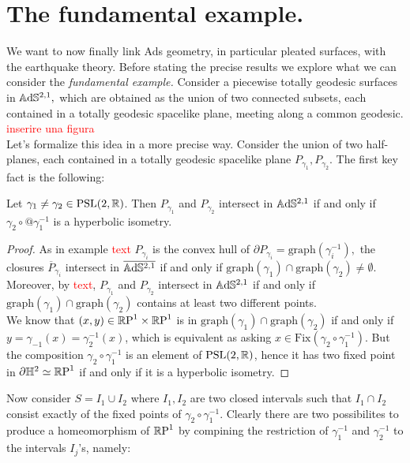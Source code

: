 \section{The fundamental example.} We want to now finally link Ads geometry, in particular pleated surfaces, with the earthquake theory. Before stating the precise results we explore what we can consider the \textit{fundamental example.} Consider a piecewise totally geodesic surfaces in $\A^{2,1},$ which are obtained as the union of two connected subsets, each contained in a totally geodesic spacelike plane, meeting along a common geodesic. \textcolor{red}{inserire una figura}\\
Let's formalize this idea in a more precise way. Consider the union of two half-planes, each contained in a totally geodesic spacelike plane $P_{\gamma_1},P_{\gamma_2}$. The first key fact is the following:

\begin{lemma}\label{Mati}
    Let $\gamma_1\neq\gamma_2\in\PSL$. Then $P_{\gamma_1}$ and $P_{\gamma_2}$ intersect in $\A^{2,1}$ if and only if $\gamma_2\circ@{\gamma_1^{-1}}$ is a hyperbolic isometry. 
\end{lemma}
\begin{proof}
    As in example \textcolor{red}{text} $P_{\gamma_i}$ is the convex hull of $\partial P_{\gamma_i}=\text{graph}(\gamma_i^{-1}),$ the closures $\overline{P}_{\gamma_i}$  intersect in $\overline{\A^{2,1}}$ if and only if $\text{graph}(\gamma_1)\cap\text{graph}(\gamma_2)\neq\emptyset$. Moreover, by \textcolor{red}{text}, $P_{\gamma_1}$ and $P_{\gamma_2}$ intersect in $\A^{2,1}$ if and only if $\text{graph}(\gamma_1)\cap\text{graph}(\gamma_2)$ contains at least two different points. \\
    We know that $(x,y)\in\T$ is in $\text{graph}(\gamma_1)\cap\text{graph}(\gamma_2)$ if and only if $y=\gamma_{-1}(x)=\gamma_2^{-1}(x)$, which is equivalent as asking $x\in\text{Fix}(\gamma_2\circ\gamma_1^{-1})$. But the composition $\gamma_2\circ\gamma_1^{-1}$ is an element of $\PSL$, hence it has two fixed point in $\partial\H^2\simeq\S$ if and only if it is a hyperbolic isometry.
\end{proof}

Now consider $S=I_1\cup I_2$ where $I_1,I_2$ are two closed intervals such that $I_1\cap I_2$ consist exactly of the fixed points of $\gamma_2\circ\gamma_1^{-1}.$ Clearly there are two possibilites to produce a homeomorphism of $\S$ by compining the restriction of $\gamma_1^{-1}$ and $\gamma_2^{-1}$ to the intervals $I_j$'s, namely: 

